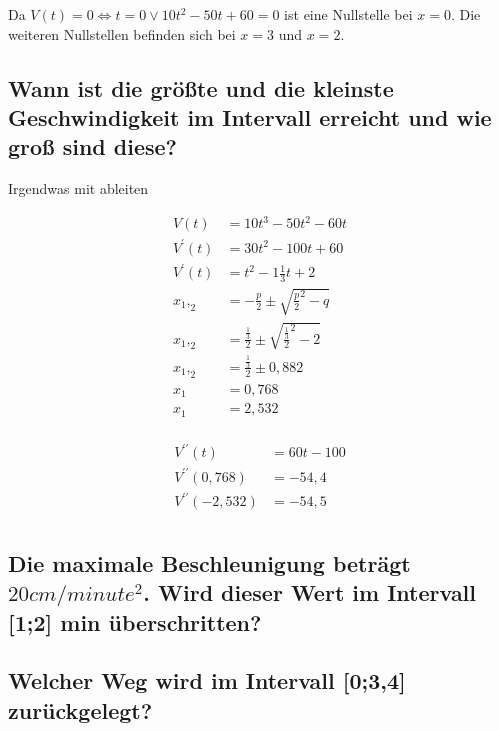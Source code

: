 \documentclass[a4paper,11pt]{scrartcl}
\begin{document}
Da $V(t) = 0 \Leftrightarrow t = 0 \vee 10t^2 - 50t + 60 = 0$ ist eine
Nullstelle bei $x = 0$. Die weiteren Nullstellen befinden sich bei $x = 3$ und
$x = 2$.

\subsection{Wann ist die größte und die kleinste Geschwindigkeit im Intervall
erreicht und wie groß sind diese?}

\begin{outline}
  \1 Irgendwas mit ableiten
\end{outline}

\begin{align*}
  V(t) &= 10t^3 - 50t^2 - 60t                               \\
  V^\prime(t) &= 30t^2 - 100t + 60  \\
  V^\prime(t) &= t^2  - 1\frac{1}{3}t + 2  \\
  x_1,_2 &= -\frac{p}{2} \pm \sqrt{\frac{p}{2}^2 - q} \\
  x_1,_2 &= \frac{\frac{1}{3}}{2} \pm \sqrt{\frac{\frac{1}{3}}{2}^2 - 2} \\
  x_1,_2 &= \frac{\frac{1}{3}}{2} \pm 0,882 \\
  x_1   &= 0,768  \\
  x_1   &= 2,532  \\
\end{align*}

\begin{align*}
  V^{\prime\prime}(t) &= 60t - 100  \\
  V^{\prime\prime}(0,768) &= -54,4  \\
  V^{\prime\prime}(-2,532) &= -54,5 \\
\end{align*}

\subsection{Die maximale Beschleunigung beträgt $20cm / minute^2$. Wird dieser
Wert im Intervall [1;2] min überschritten?}

\subsection{Welcher Weg wird im Intervall [0;3,4] zurückgelegt?}
\end{document}
